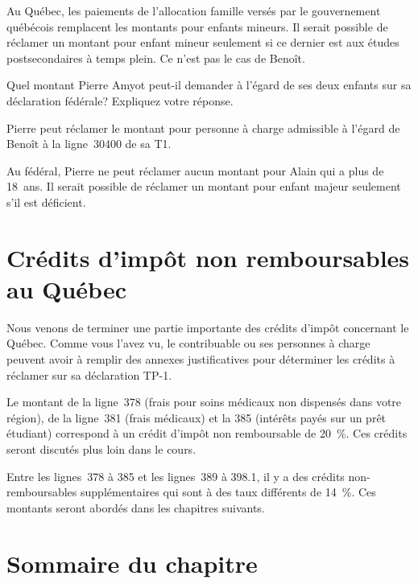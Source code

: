 Au Québec, les paiements de l'allocation famille versés par le gouvernement québécois remplacent les montants pour enfants mineurs. Il serait possible de réclamer un montant pour enfant mineur seulement si ce dernier est aux études postsecondaires à temps plein. Ce n'est pas le cas de Benoît.

\begin{sousQuestion}
	Quel montant Pierre Amyot peut-il demander à l'égard de ses deux enfants sur sa déclaration fédérale? Expliquez votre réponse.
\end{sousQuestion}
Pierre peut réclamer le montant pour personne à charge admissible à l'égard de Benoît à la ligne~30400 de sa T1.

Au fédéral, Pierre ne peut réclamer aucun montant pour Alain qui a plus de 18~ans. Il serait possible de réclamer un montant pour enfant majeur seulement s'il est déficient.



\section{Crédits d'impôt non remboursables au Québec}
\begin{intro}
	Nous venons de terminer une partie importante des crédits d'impôt concernant le Québec. Comme vous l'avez vu, le contribuable ou ses personnes à charge peuvent avoir à remplir des annexes justificatives pour déterminer les crédits à réclamer sur sa déclaration TP-1.
\end{intro}

\begin{note}
	Le montant de la ligne~378 (frais pour soins médicaux non dispensés dans votre région), de la ligne~381 (frais médicaux) et la 385 (intérêts payés sur un prêt étudiant) correspond à un crédit d'impôt non remboursable de 20~\%. Ces crédits seront discutés plus loin dans le cours.
\end{note}

\begin{note}
	Entre les lignes~378 à 385 et les lignes~389 à 398.1, il y a des crédits non-remboursables supplémentaires qui sont à des taux différents de 14~\%. Ces montants seront abordés dans les chapitres suivants.
\end{note}



\section{Sommaire du chapitre}

